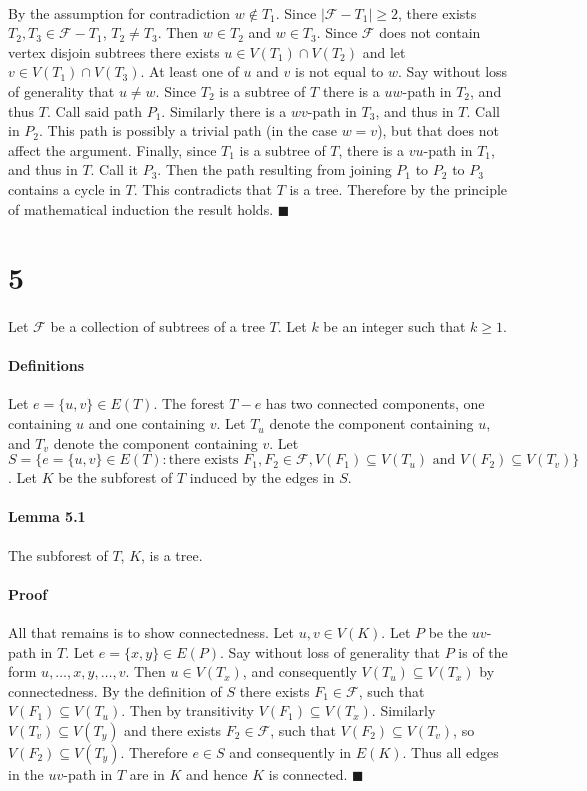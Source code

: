 \documentclass[letterpaper,12pt,oneside,onecolumn]{report}
\begin{document}
\paragraph{}
 By the assumption for contradiction $w \not\in T_1$. Since $|\mathcal{F} - T_1| \geq 2$, there exists $T_2, T_3 \in \mathcal{F} - T_1$, $T_2 \neq T_3$. Then $w \in T_2$ and $w \in T_3$. Since $\mathcal{F}$ does not contain vertex disjoin subtrees there exists $u \in V(T_1) \cap V(T_2)$ and let $v \in V(T_1) \cap V(T_3)$. At least one of $u$ and $v$ is not equal to $w$. Say without loss of generality that $u \neq w$. Since $T_2$ is a subtree of $T$ there is a $uw$-path in $T_2$, and thus $T$. Call said path $P_1$. Similarly there is a $wv$-path in $T_3$, and thus in $T$. Call in $P_2$. This path is possibly a trivial path (in the case $w=v$), but that does not affect the argument. Finally, since $T_1$ is a subtree of $T$, there is a $vu$-path in $T_1$, and thus in $T$. Call it $P_3$. Then the path resulting from joining $P_1$ to $P_2$ to $P_3$ contains a cycle in $T$. This contradicts that $T$ is a tree. Therefore by the principle of mathematical induction the result holds. $\blacksquare$
\section*{5}
\paragraph{}
Let $\mathcal{F}$ be a collection of subtrees of a tree $T$. Let $k$ be an integer such that $k \geq 1$.
\paragraph{Definitions}
Let $e=\{u,v\} \in E(T)$. The forest $T-e$ has two connected components, one containing $u$ and one containing $v$. Let $T_u$ denote the component containing $u$, and $T_v$ denote the component containing $v$. Let $S = \{e=\{u,v\} \in E(T) : \text{there exists } F_1,F_2 \in \mathcal{F}, V(F_1) \subseteq V(T_u) \text{ and } V(F_2) \subseteq V(T_v)\}$. Let $K$ be the subforest of $T$ induced by the edges in $S$.
\paragraph{Lemma 5.1}
The subforest of $T$, $K$, is a tree.
\paragraph{Proof}
All that remains is to show connectedness. Let $u,v \in V(K)$. Let $P$ be the $uv$-path in $T$. Let $e=\{x,y\} \in E(P)$. Say without loss of generality that $P$ is of the form $u,\dots,x,y,\dots,v$. Then $u \in V(T_x)$, and consequently $V(T_u) \subseteq V(T_x)$ by connectedness. By the definition of $S$ there exists $F_1 \in \mathcal{F}$, such that $V(F_1) \subseteq V(T_u)$. Then by transitivity $V(F_1) \subseteq V(T_x)$. Similarly $V(T_v) \subseteq V(T_y)$ and there exists $F_2 \in \mathcal{F}$, such that $V(F_2) \subseteq V(T_v)$, so $V(F_2) \subseteq V(T_y)$. Therefore $e \in S$ and consequently in $E(K)$. Thus all edges in the $uv$-path in $T$ are in $K$ and hence $K$ is connected. $\blacksquare$
\end{document}
